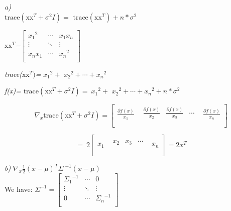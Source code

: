 \documentclass[
]{article}
\begin{document}
\emph{a)} \\

\(\text{trace}\left( \text{xx}^{T} + \sigma^{2}I \right) = \text{\ trace}\left(\text{xx}^{T} \right) + n*\sigma^{2}\)



\(\text{xx}^{T}\)\emph{=}\(\begin{bmatrix}
{x_{1}}^{2} & \cdots & x_{1}x_{n} \\
 \vdots & \ddots & \vdots \\
x_{n}x_{1} & \cdots & {x_{n}}^{2} \\
\end{bmatrix}\)

\emph{trace(}\(\text{xx}^{T})\)\emph{=} \({x_{1}}^{2} +\)
\({x_{2}}^{2} + \cdots + {x_{n}}^{2}\)

\emph{f(x)=}\(\text{\ trace}\left( \text{xx}^{T} + \sigma^{2}I \right) = \ {x_{1}}^{2} +\)
\({x_{2}}^{2} + \cdots + {x_{n}}^{2} + n*\sigma^{2}\)

\[\nabla_{x}\text{trace}\left( \text{xx}^{T} + \sigma^{2}I \right) = \begin{bmatrix}
\frac{\partial f(x)}{x_{1}} & \begin{matrix}
\frac{\partial f(x)}{x_{2}} & \frac{\partial f(x)}{x_{3}} & \cdots \\
\end{matrix} & \frac{\partial f(x)}{x_{n}} \\
\end{bmatrix}\]

\[= \ 2\begin{bmatrix}
x_{1} & \begin{matrix}
x_{2} & x_{3} & \cdots \\
\end{matrix} & x_{n} \\
\end{bmatrix} = 2x^{T}\]

\emph{b)}
\(\nabla_{x}\frac{1}{2}{(x - \mu)}^{T}{\Sigma\ }^{- 1}(x - \mu)\)\\
We have:
\(\Sigma^{- 1} = \begin{bmatrix}
{\Sigma_{1}}^{- 1} & \cdots & 0 \\
 \vdots & \ddots & \vdots \\
0 & \cdots & {\Sigma_{n}}^{- 1} \\
\end{bmatrix}\)
\end{document}
